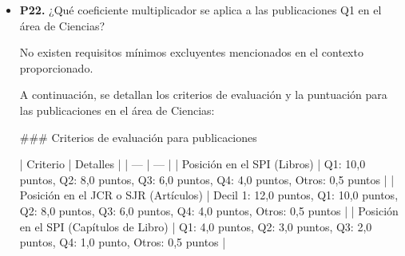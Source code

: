 \documentclass{article}
\begin{document}
\begin{itemize}
\begin{respuesta_agente}
\#\#\# Cálculo de puntos:
Para calcular los puntos obtenidos por 300 horas de clase en un Máster Oficial, se aplican los siguientes pasos:

1. **Cálculo inicial**: 300 horas / 10 horas = 30 unidades.
2. **Puntuación base**: 30 unidades * 1,00 punto/unidad = 30 puntos.
3. **Complemento 1 (multiplicativo)**: Como se trata de un Máster Oficial, se aplica el complemento 1: 30 puntos * 1,50 = 45 puntos.
4. **Complemento 2 (multiplicando al complemento 1)**: No se menciona que la docencia se haya impartido en inglés u otra lengua diferente, por lo que no se aplica este complemento.
5. **Escalado**: Dado que el límite máximo de horas de docencia es 1200 horas, y se han impartido 300 horas, no se supera el límite, por lo que no se aplica el escalado.

\#\#\# Puntuación final:
La puntuación final sería de 45 puntos. Sin embargo, es importante tener en cuenta que el máximo permitido en este apartado es 50 puntos, y se debe considerar si hay otros factores que puedan influir en la puntuación final, como la afinidad de las asignaturas impartidas o la aplicación de la regla de saturación.

En resumen, por 300 horas de clase en un Máster Oficial, se obtendrían **45 puntos**, siempre y cuando no se superen los límites establecidos y se cumplan los demás requisitos y criterios de evaluación.
    \end{respuesta_agente}
    \vspace{0.2cm}
    \noindent\textbf{Documentos recuperados:} No se detectaron fuentes.

  \item \textbf{P22.} ¿Qué coeficiente multiplicador se aplica a las publicaciones Q1 en el área de Ciencias? \\
    \begin{respuesta_agente}
      No existen requisitos mínimos excluyentes mencionados en el contexto proporcionado.

A continuación, se detallan los criterios de evaluación y la puntuación para las publicaciones en el área de Ciencias:

\#\#\# Criterios de evaluación para publicaciones

| Criterio | Detalles |
| --- | --- |
| Posición en el SPI (Libros) | Q1: 10,0 puntos, Q2: 8,0 puntos, Q3: 6,0 puntos, Q4: 4,0 puntos, Otros: 0,5 puntos |
| Posición en el JCR o SJR (Artículos) | Decil 1: 12,0 puntos, Q1: 10,0 puntos, Q2: 8,0 puntos, Q3: 6,0 puntos, Q4: 4,0 puntos, Otros: 0,5 puntos |
| Posición en el SPI (Capítulos de Libro) | Q1: 4,0 puntos, Q2: 3,0 puntos, Q3: 2,0 puntos, Q4: 1,0 punto, Otros: 0,5 puntos |


\end{respuesta_agente}
\end{itemize}
\end{document}
